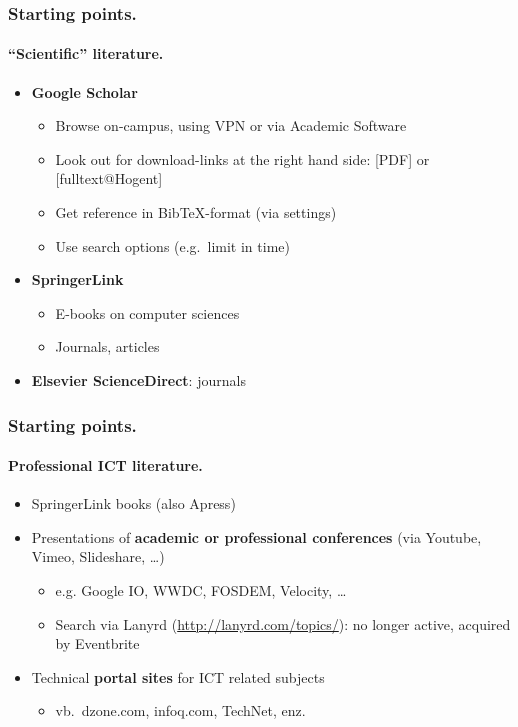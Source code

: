 \documentclass[aspectratio=169]{beamer}
\begin{document}
    \begin{frame}
        \frametitle{Starting points.}
        \framesubtitle{``Scientific'' literature.}
        
        \begin{itemize}
            \item<+-> \textbf{Google Scholar}
            \begin{itemize}
                \item Browse on-campus, using VPN or via Academic Software
                \item Look out for download-links at the right hand side: [PDF] or [fulltext@Hogent]
                \item Get reference in Bib{\TeX}-format (via settings)
                \item Use search options (e.g.~limit in time)
            \end{itemize}
            \item<+-> \textbf{SpringerLink}
            \begin{itemize}
                \item E-books on computer sciences
                \item Journals, articles
            \end{itemize}
            \item<+-> \textbf{Elsevier ScienceDirect}: journals
        \end{itemize}
    \end{frame}
    
    \begin{frame}
        \frametitle{Starting points.}
        \framesubtitle{Professional ICT literature.}
        
        \begin{itemize}
            \item SpringerLink books (also Apress)
            \item Presentations of \textbf{academic or professional conferences} (via Youtube, Vimeo, Slideshare, \dots)
            \begin{itemize}
                \item e.g. Google IO, WWDC, FOSDEM, Velocity, \dots
                \item Search via Lanyrd (\url{http://lanyrd.com/topics/}): no longer active, acquired by Eventbrite
            \end{itemize}
            \item<+-> Technical \textbf{portal sites} for ICT related subjects
            \begin{itemize}
                \item vb.~dzone.com, infoq.com, TechNet, enz.
            \end{itemize}
        \end{itemize}
    \end{frame}
    
\end{document}
